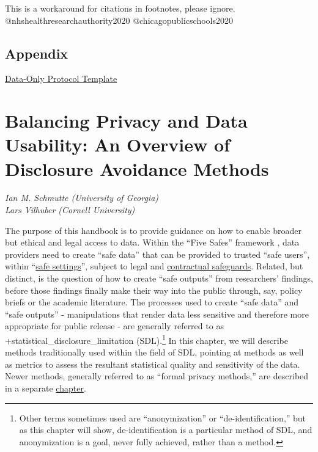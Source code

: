 \documentclass[
]{WileySix}
\begin{document}
\begin{invisible}
This is a workaround for citations in footnotes, please ignore.
@nhshealthresearchauthority2020 @chicagopublicschools2020
\end{invisible}

\hypertarget{appendix-1}{%
\subsection*{Appendix}\label{appendix-1}}

\href{./appendix/irb_appendix.pdf}{Data-Only Protocol Template}

\hypertarget{discavoid}{%
\section{Balancing Privacy and Data Usability: An Overview of Disclosure Avoidance Methods}\label{discavoid}}

\emph{Ian M. Schmutte (University of Georgia)}\\
\emph{Lars Vilhuber (Cornell University)}

The purpose of this handbook is to provide guidance on how to enable broader but ethical and legal access to data. Within the ``Five Safes'' framework \citep{desai_five_2016}, data providers need to create ``safe data'' that can be provided to trusted ``safe users'', within ``\protect\hyperlink{security}{safe settings}'', subject to legal and \protect\hyperlink{dua}{contractual safeguards}. Related, but distinct, is the question of how to create ``safe outputs'' from researchers' findings, before those findings finally make their way into the public through, say, policy briefs or the academic literature. The processes used to create ``safe data'' and ``safe outputs'' - manipulations that render data less sensitive and therefore more appropriate for public release - are generally referred to as +statistical\_disclosure\_limitation\textbar{} (SDL).\footnote{Other terms sometimes used are ``anonymization'' or ``de-identification,'' but as this chapter will show, de-identification is a particular method of SDL, and anonymization is a goal, never fully achieved, rather than a method.} In this chapter, we will describe methods traditionally used within the field of SDL, pointing at methods as well as metrics to assess the resultant statistical quality and sensitivity of the data. Newer methods, generally referred to as ``formal privacy methods,'' are described in a separate \protect\hyperlink{diffpriv}{chapter}.
\end{document}
